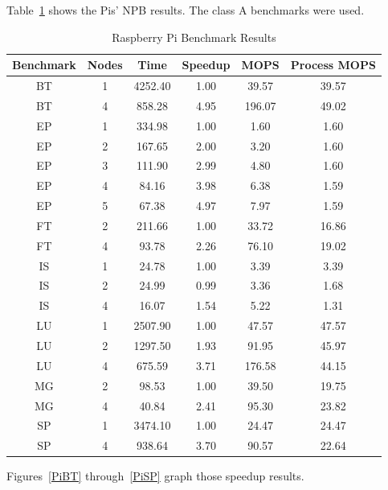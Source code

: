 \documentclass{acm_proc_article-sp}
\begin{document}
Table~\ref{PiTable} shows the Pis' NPB results. The class A benchmarks were used.

\begin{table}[tbp]
\centering
\caption{Raspberry Pi Benchmark Results}
\label{PiTable}
\begin{tabular}{ c | c || c | c | c | c }
	Benchmark & Nodes & Time & Speedup & MOPS & Process MOPS\\ \hline
    BT & 1 & 4252.40 & 1.00  & 39.57 & 39.57 \\
    BT & 4 & 858.28 & 4.95  & 196.07 & 49.02 \\
    EP & 1 & 334.98 & 1.00  & 1.60   & 1.60 \\
    EP & 2 & 167.65 & 2.00  & 3.20   & 1.60 \\
    EP & 3 & 111.90 & 2.99  & 4.80   & 1.60 \\
    EP & 4 & 84.16 & 3.98  & 6.38  & 1.59 \\
    EP & 5 & 67.38 & 4.97  & 7.97  & 1.59 \\
    FT & 2 & 211.66 & 1.00  & 33.72 & 16.86 \\
    FT & 4 & 93.78 & 2.26  & 76.10  & 19.02 \\
    IS & 1 & 24.78 & 1.00  & 3.39  & 3.39 \\
    IS & 2 & 24.99 & 0.99  & 3.36  & 1.68 \\
    IS & 4 & 16.07 & 1.54  & 5.22  & 1.31 \\
    LU & 1 & 2507.90 & 1.00  & 47.57 & 47.57 \\
    LU & 2 & 1297.50 & 1.93  & 91.95 & 45.97 \\
    LU & 4 & 675.59 & 3.71  & 176.58 & 44.15 \\
    MG & 2 & 98.53 & 1.00  & 39.50  & 19.75 \\
    MG & 4 & 40.84 & 2.41  & 95.30  & 23.82 \\
    SP & 1 & 3474.10 & 1.00  & 24.47 & 24.47 \\
    SP & 4 & 938.64 & 3.70  & 90.57 & 22.64 \\
\end{tabular}
\end{table}

Figures~\ref{PiBT} through~\ref{PiSP} graph those speedup results.
\end{document}
